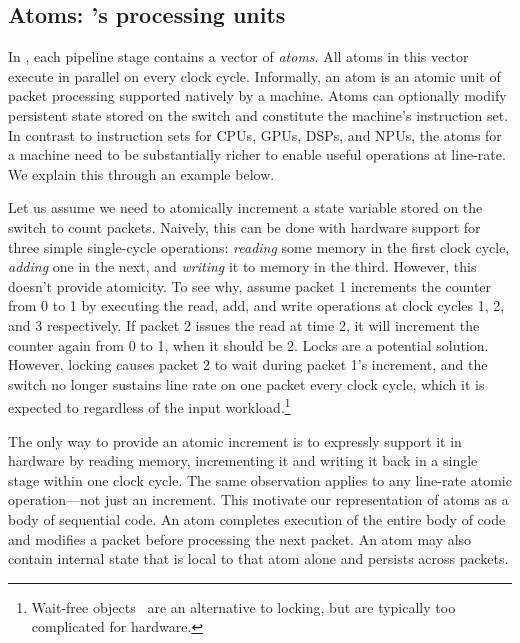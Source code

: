 \subsection{Atoms: \absmachine's processing units}
\label{ss:atoms}

In \absmachine, each pipeline stage contains a vector of
\textit{atoms}. All atoms in this vector execute in parallel on every
clock cycle.  Informally, an atom is an atomic unit of packet processing
supported natively by a \absmachine machine. Atoms can optionally
modify persistent state stored on the switch and constitute the
machine's instruction set.  In contrast to instruction sets for CPUs,
GPUs, DSPs, and NPUs, the atoms for a \absmachine machine need to be
substantially richer to enable useful operations at line-rate. We
explain this through an example below.

Let us assume we need to atomically increment a state variable stored on the
switch to count packets. Naively, this can be done with hardware support for
three simple single-cycle operations: \textit{reading} some memory in the first
clock cycle, \textit{adding} one in the next, and \textit{writing} it to memory
in the third. However, this doesn't provide atomicity. To see why, assume
packet 1 increments the counter from 0 to 1 by executing the read, add, and
write operations at clock cycles 1, 2, and 3 respectively.  If packet 2 issues
the read at time 2, it will increment the counter again from 0 to 1, when it
should be 2. Locks are a potential solution. However, locking causes packet 2
to wait during packet 1's increment, and the switch no longer sustains line
rate on one packet every clock cycle, which it is expected to regardless of the
input workload.\footnote{Wait-free objects~\cite{herlihy_wait} are an
alternative to locking, but are typically too complicated for hardware.}

The only way to provide an atomic increment is to expressly support it in
hardware by reading memory, incrementing it and writing it back in a single
stage within one clock cycle. The same observation applies to any line-rate
atomic operation---not just an increment.  This motivate our representation of
atoms as a body of sequential code. An atom completes execution of the entire
body of code and modifies a packet before processing the next packet.  An atom
may also contain internal state that is local to that atom alone and persists
across packets.

